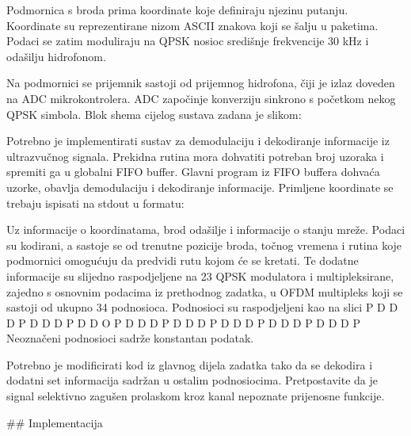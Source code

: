 Podmornica s broda prima koordinate koje definiraju njezinu putanju.
Koordinate su reprezentirane nizom ASCII znakova koji se šalju u paketima. Podaci se zatim moduliraju na QPSK nosioc središnje frekvencije 30 kHz i odašilju hidrofonom.

Na podmornici se prijemnik sastoji od prijemnog hidrofona, čiji je izlaz doveden na ADC mikrokontrolera. ADC započinje konverziju sinkrono s početkom nekog QPSK simbola. Blok shema cijelog sustava zadana je slikom:

Potrebno je implementirati sustav za demodulaciju i dekodiranje informacije iz ultrazvučnog signala. Prekidna rutina mora dohvatiti potreban broj uzoraka i spremiti ga u globalni FIFO buffer. Glavni program iz FIFO buffera dohvaća uzorke, obavlja demodulaciju i dekodiranje informacije. Primljene koordinate se trebaju ispisati na stdout u formatu:

Uz informacije o koordinatama, brod odašilje i informacije o stanju mreže. Podaci su kodirani, a sastoje se od trenutne pozicije broda, točnog vremena i rutina koje podmornici omogućuju da predvidi rutu kojom će se kretati. Te dodatne informacije su slijedno raspodjeljene na 23 QPSK modulatora i multipleksirane, zajedno s osnovnim podacima iz prethodnog zadatka, u OFDM multipleks koji se sastoji od ukupno 34 podnosioca. Podnosioci su raspodjeljeni kao na slici
P D D D P D D D P D D O P D D D P D D D P D D D P D D D P D D D P 
Neoznačeni podnosioci sadrže konstantan podatak.

Potrebno je modificirati kod iz glavnog dijela zadatka tako da se dekodira i dodatni set informacija sadržan u ostalim podnosiocima. Pretpostavite da je signal selektivno zagušen prolaskom kroz kanal nepoznate prijenosne funkcije.

## Implementacija

